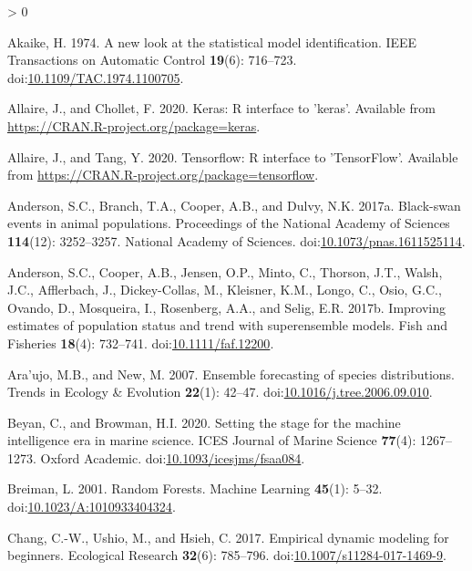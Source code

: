 \documentclass[
]{article}
\newlength{\cslhangindent}
\newenvironment{CSLReferences}[2] %
 {%
  \setlength{\parindent}{0pt}
  \ifodd #1 \everypar{\setlength{\hangindent}{\cslhangindent}}\ignorespaces\fi
  \ifnum #2 > 0
  \setlength{\parskip}{#2\baselineskip}
  \fi
 }%
 {}
\begin{document}
\hypertarget{refs}{}
\begin{CSLReferences}{1}{0}
\leavevmode\hypertarget{ref-akaike1974}{}%
Akaike, H. 1974. A new look at the statistical model identification. IEEE Transactions on Automatic Control \textbf{19}(6): 716--723. doi:\href{https://doi.org/10.1109/TAC.1974.1100705}{10.1109/TAC.1974.1100705}.

\leavevmode\hypertarget{ref-allaire2020a}{}%
Allaire, J., and Chollet, F. 2020. Keras: R interface to 'keras'. Available from \url{https://CRAN.R-project.org/package=keras}.

\leavevmode\hypertarget{ref-allaire2020}{}%
Allaire, J., and Tang, Y. 2020. Tensorflow: R interface to 'TensorFlow'. Available from \url{https://CRAN.R-project.org/package=tensorflow}.

\leavevmode\hypertarget{ref-anderson2017c}{}%
Anderson, S.C., Branch, T.A., Cooper, A.B., and Dulvy, N.K. 2017a. Black-swan events in animal populations. Proceedings of the National Academy of Sciences \textbf{114}(12): 3252--3257. {National Academy of Sciences}. doi:\href{https://doi.org/10.1073/pnas.1611525114}{10.1073/pnas.1611525114}.

\leavevmode\hypertarget{ref-anderson2017a}{}%
Anderson, S.C., Cooper, A.B., Jensen, O.P., Minto, C., Thorson, J.T., Walsh, J.C., Afflerbach, J., Dickey-Collas, M., Kleisner, K.M., Longo, C., Osio, G.C., Ovando, D., Mosqueira, I., Rosenberg, A.A., and Selig, E.R. 2017b. Improving estimates of population status and trend with superensemble models. Fish and Fisheries \textbf{18}(4): 732--741. doi:\href{https://doi.org/10.1111/faf.12200}{10.1111/faf.12200}.

\leavevmode\hypertarget{ref-araujo2007}{}%
Ara'ujo, M.B., and New, M. 2007. Ensemble forecasting of species distributions. Trends in Ecology \& Evolution \textbf{22}(1): 42--47. doi:\href{https://doi.org/10.1016/j.tree.2006.09.010}{10.1016/j.tree.2006.09.010}.

\leavevmode\hypertarget{ref-beyan2020}{}%
Beyan, C., and Browman, H.I. 2020. Setting the stage for the machine intelligence era in marine science. ICES Journal of Marine Science \textbf{77}(4): 1267--1273. {Oxford Academic}. doi:\href{https://doi.org/10.1093/icesjms/fsaa084}{10.1093/icesjms/fsaa084}.

\leavevmode\hypertarget{ref-breiman2001}{}%
Breiman, L. 2001. Random {Forests}. Machine Learning \textbf{45}(1): 5--32. doi:\href{https://doi.org/10.1023/A:1010933404324}{10.1023/A:1010933404324}.

\leavevmode\hypertarget{ref-chang2017}{}%
Chang, C.-W., Ushio, M., and Hsieh, C. 2017. Empirical dynamic modeling for beginners. Ecological Research \textbf{32}(6): 785--796. doi:\href{https://doi.org/10.1007/s11284-017-1469-9}{10.1007/s11284-017-1469-9}.


\end{CSLReferences}
\end{document}
